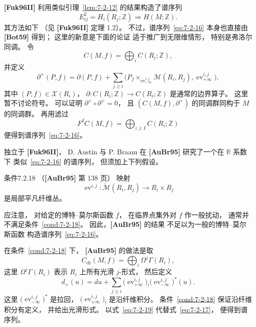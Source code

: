 \textbf{[Fuk96II]}
利用类似引理~\ref{lem:7-2-12}
的结果构造了谱序列
\begin{equation}
E^2_{ij}=H_i(R_j;\mathbb Z)
\Longrightarrow H(M;\mathbb Z).
\tag{7.2.16}\label{eq:7-2-16}
\end{equation}
其方法如下
（见 \textbf{[Fuk96II]} 定理 1.2）。
不过，谱序列~\eqref{eq:7-2-16}
本身也直接由 \textbf{[Bot59]} 得到；
这里的新意是下面的论证
适于推广到无限维情形，
特别是弗洛尔同调。
令
\[
C(M,f)=\bigoplus_i C(R_i;\mathbb Z),
\]
并定义
\begin{equation}
\partial^+(P,f)
=\partial(P,f)
+\sum_{j\ge i}
\bigl(
P_f\mathop{\times}_{\operatorname{ev}^{i,j}_{-\infty}}
\mathcal M(R_i,R_j),
\operatorname{ev}^{i,j}_{+\infty}
\bigr),
\tag{7.2.17}\label{eq:7-2-17}
\end{equation}
其中 $(P,f)\in\mathcal X(R_i)$，
$\partial\colon C(R_i;\mathbb Z)
\to C(R_i;\mathbb Z)$
是通常的边界算子。
这里暂不讨论符号。
可以证明
$\partial^+\circ\partial^+=0$，
且
$(C(M,f),\partial^+)$
的同调群同构于 $M$ 的同调群。
再用滤过
\[
F^I C(M,f)
=\bigoplus_{i\ge I}C(R_i;\mathbb Z)
\]
便得到谱序列~\eqref{eq:7-2-16}。

独立于 \textbf{[Fuk96II]}，
D. Austin 与 P. Braam
在 \textbf{[AuBr95]}
研究了一个在 $\mathbb R$ 系数下
类似~\eqref{eq:7-2-16}
的谱序列，
但须加上下列假设。

\begin{statement}{条件}{7.2.18}\label{cond:7-2-18}
（\textbf{[AuBr95]} 第 138 页）
映射
\[
\operatorname{ev}^{i,j}\colon
\mathring{\mathcal M}(R_i,R_j)
\longrightarrow R_i\times R_j
\]
是局部平凡纤维丛。
\end{statement}

应注意，
对给定的博特--莫尔斯函数 $f$，
在临界点集外对 $f$ 作一般扰动，
通常并不满足条件~\ref{cond:7-2-18}。
因此，\textbf{[AuBr95]} 的结果
不足以为一般的博特--莫尔斯函数
构造谱序列~\eqref{eq:7-2-16}。

在条件~\ref{cond:7-2-18} 下，
\textbf{[AuBr95]} 的做法是取
\[
C_{\mathrm{dr}}(M,f)
=\bigoplus_i\Omega^j\Gamma(R_i),
\]
这里 $\Omega^j\Gamma(R_i)$
表示 $R_i$ 上所有光滑 $j$-形式，
然后定义
\begin{equation}
d_+(u)=du
+\sum_{j\ge i}
\bigl(\operatorname{ev}^{i,j}_{+\infty}\bigr)_!
\bigl(\operatorname{ev}^{i,j}_{-\infty}\bigr)^*(u).
\tag{7.2.19}\label{eq:7-2-19}
\end{equation}
这里
$\bigl(\operatorname{ev}^{i,j}_{-\infty}\bigr)^*$
是拉回，
$\bigl(\operatorname{ev}^{i,j}_{+\infty}\bigr)_!$
是沿纤维积分。
条件~\ref{cond:7-2-18}
保证沿纤维积分有定义，
并给出光滑形式。
以式~\eqref{eq:7-2-19}
代替式~\eqref{eq:7-2-17}，
便得到谱序列。

